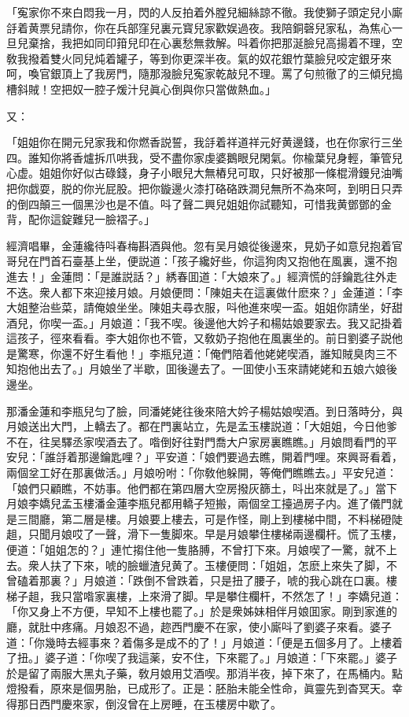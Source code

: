 「寃家你不來白悶我一月，閃的人反拍着外膛兒細絲諒不徹。我使獅子頭定兒小廝㧱着黄票兒請你，你在兵部窪兒裏元寳兒家歡娱過夜。我陪銅磬兒家私，為焦心一旦兒棄捨，我把如同印箝兒印在心裏愁無救解。呌着你把那涎臉兒高揚着不理，空敎我撥着雙火同兒炖着罐子，等到你更深半夜。氣的奴花銀竹葉臉兒咬定銀牙來呵，喚官銀頂上了我房門，隨那潑臉兒寃家乾敲兒不理。罵了句煎徹了的三傾兒搗槽斜賊！空把奴一腔子煖汁兒眞心倒與你只當做熱血。」

又：

「姐姐你在開元兒家我和你燃香説誓，我㧱着祥道祥元好黄邊錢，也在你家行三坐四。誰知你將香爐拆爪哄我，受不盡你家虔婆鵝眼兒閑氣。你楡葉兒身輕，筆管兒心虚。姐姐你好似古碌錢，身子小眼兒大無樁兒可取，只好被那一條棍滑鏝兒油嘴把你戯耍，脱的你光屁股。把你鏇邊火漆打硌硌跌澗兒無所不為來呵，到明日只弄的倒四顛三一個黑沙也是不值。呌了聲二興兒姐姐你試聽知，可惜我黄鄧鄧的金背，配你這錠難兒一臉褶子。」

經濟唱畢，金蓮纔待呌春梅斟酒與他。忽有吴月娘從後邊來，見奶子如意兒抱着官哥兒在門首石臺基上坐，便説道：「孩子纔好些，你這狗肉又抱他在風裏，還不抱進去！」金蓮問：「是誰説話？」綉春囬道：「大娘來了。」經濟慌的㧱鑰匙往外走不迭。衆人都下來迎接月娘。月娘便問：「陳姐夫在這裏做什麽來？」金蓮道：「李大姐整治些菜，請俺娘坐坐。陳姐夫尋衣服，呌他進來喫一盃。姐姐你請坐，好甜酒兒，你喫一盃。」月娘道：「我不喫。後邊他大妗子和楊姑娘要家去。我又記掛着這孩子，徑來看看。李大姐你也不管，又敎奶子抱他在風裏坐的。前日劉婆子説他是驚寒，你還不好生看他！」李瓶兒道：「俺們陪着他姥姥喫酒，誰知賊臭肉三不知抱他出去了。」月娘坐了半歇，囬後邊去了。一囬使小玉來請姥姥和五娘六娘後邊坐。

那潘金蓮和李瓶兒匀了臉，同潘姥姥往後來陪大妗子楊姑娘喫酒。到日落時分，與月娘送出大門，上轎去了。都在門裏站立，先是孟玉樓説道：「大姐姐，今日他爹不在，往吴驛丞家喫酒去了。喒倒好往對門喬大户家房裏瞧瞧。」月娘問看門的平安兒：「誰㧱着那邊鑰匙哩？」平安道：「娘們要過去瞧，開着門哩。來興哥看着，兩個坌工好在那裏做活。」月娘吩咐：「你敎他躲開，等俺們瞧瞧去。」平安兒道：「娘們只顧瞧，不妨事。他們都在第四層大空房撥灰篩土，呌出來就是了。」當下月娘李嬌兒孟玉樓潘金蓮李瓶兒都用轎子短搬，兩個坌工擡過房子内。進了儀門就是三間廳，第二層是樓。月娘要上樓去，可是作怪，剛上到樓梯中間，不料梯磴陡趄，只聞月娘哎了一聲，滑下一隻脚來。早是月娘攀住樓梯兩邊欄杆。慌了玉樓，便道：「姐姐怎的？」連忙搊住他一隻胳膊，不曾打下來。月娘喫了一驚，就不上去。衆人扶了下來，唬的臉蠟渣兒黄了。玉樓便問：「姐姐，怎麽上來失了脚，不曾磕着那裏？」月娘道：「跌倒不曾跌着，只是扭了腰子，唬的我心跳在口裏。樓梯子趄，我只當喒家裏樓，上來滑了脚。早是攀住欄杆，不然怎了！」李嬌兒道：「你又身上不方便，早知不上樓也罷了。」於是衆姊妹相伴月娘囬家。剛到家進的廳，就肚中疼痛。月娘忍不過，趂西門慶不在家，使小廝呌了劉婆子來看。婆子道：「你幾時去經事來？着傷多是成不的了！」月娘道：「便是五個多月了。上樓着了扭。」婆子道：「你喫了我這薬，安不住，下來罷了。」月娘道：「下來罷。」婆子於是留了兩服大黑丸子藥，敎月娘用艾酒喫。那消半夜，掉下來了，在馬桶内。點燈撥看，原來是個男胎，已成形了。正是：胚胎未能全性命，眞靈先到杳冥天。幸得那日西門慶來家，倒沒曾在上房睡，在玉樓房中歇了。


